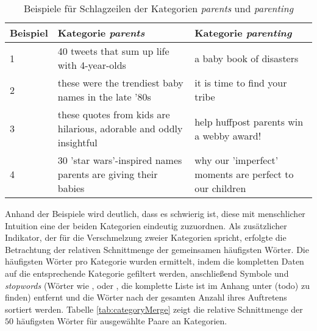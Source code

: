 \documentclass[a4paper,11pt]{article}
\begin{document}
\begin{table}[ht]
\begin{center}
\begin{tabular}{ | p{} | p{}| p{} | }
  \hline
Beispiel & Kategorie \textit{parents}  & Kategorie \textit{parenting} \\ 
  \hline
1 & 40 tweets that sum up life with 4-year-olds & a baby book of disasters \\ 
  2 & these were the trendiest baby names in the late '80s & it is time to find your tribe \\ 
  3 & these quotes from kids are hilarious, adorable and oddly insightful & help huffpost parents win a webby award! \\ 
  4 & 30  'star wars'-inspired names parents are giving their babies & why our 'imperfect' moments are perfect to our children \\ 
   \hline
\end{tabular}
\label{tab:parentsMerge}
\caption{Beispiele für Schlagzeilen der Kategorien \textit{parents} und \textit{parenting}}
\end{center}
\end{table}

Anhand der Beispiele wird deutlich, dass es schwierig ist, diese mit menschlicher Intuition eine der beiden Kategorien eindeutig zuzuordnen. Als zusätzlicher Indikator, der für die Verschmelzung zweier Kategorien spricht, erfolgte die Betrachtung der relativen Schnittmenge der gemeinsamen häufigsten Wörter. Die häufigsten Wörter pro Kategorie wurden ermittelt, indem die kompletten Daten auf die entsprechende Kategorie gefiltert werden, anschließend Symbole und \textit{stopwords} (Wörter wie ,  oder , die komplette Liste ist im Anhang unter (todo) zu finden) entfernt und die Wörter nach der gesamten Anzahl ihres Auftretens sortiert werden. Tabelle \ref{tab:categoryMerge} zeigt die relative Schnittmenge der $50$ häufigsten Wörter für ausgewählte Paare an Kategorien.
\end{document}
